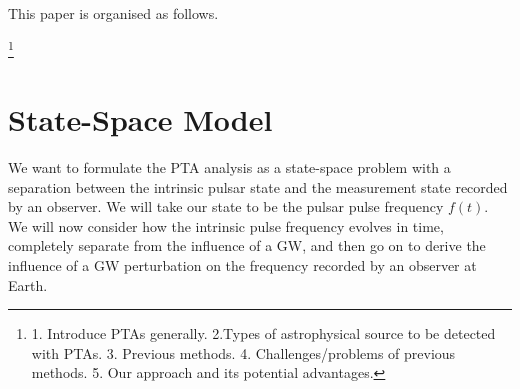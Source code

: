\documentclass[fleqn,usenatbib,useAMS]{mnras}
\begin{document}
This paper is organised as follows.


\footnote{1. Introduce PTAs generally. 2.Types of astrophysical source to be detected with PTAs. 3. Previous methods. 4. Challenges/problems of previous methods. 5. Our approach and its potential advantages. }




\section{State-Space Model}
We want to formulate the PTA analysis as a state-space problem with a separation between the intrinsic pulsar state and the measurement state recorded by an observer. We will take our state to be the pulsar pulse frequency $f(t)$. We will now consider how the intrinsic pulse frequency evolves in time, completely separate from the influence of a GW, and then go on to derive the  influence of a GW perturbation on the frequency recorded by an observer at Earth.
\end{document}
